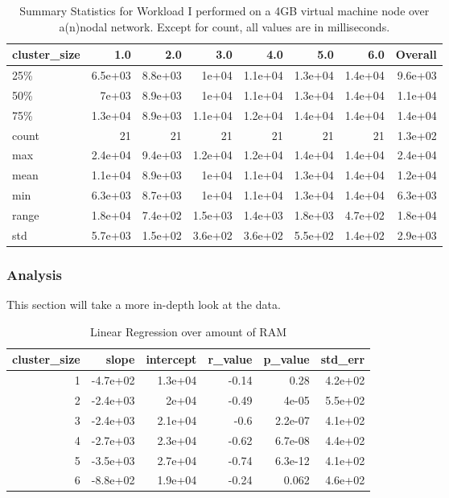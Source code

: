 \begin{table}
\begin{tabular}{lrrrrrrr}
\toprule
cluster\_size &     1.0 &     2.0 &     3.0 &     4.0 &     5.0 &     6.0 &  Overall \\
\midrule
25\%   & 6.5e+03 & 8.8e+03 &   1e+04 & 1.1e+04 & 1.3e+04 & 1.4e+04 &  9.6e+03 \\
50\%   &   7e+03 & 8.9e+03 &   1e+04 & 1.1e+04 & 1.3e+04 & 1.4e+04 &  1.1e+04 \\
75\%   & 1.3e+04 & 8.9e+03 & 1.1e+04 & 1.2e+04 & 1.4e+04 & 1.4e+04 &  1.4e+04 \\
count &      21 &      21 &      21 &      21 &      21 &      21 &  1.3e+02 \\
max   & 2.4e+04 & 9.4e+03 & 1.2e+04 & 1.2e+04 & 1.4e+04 & 1.4e+04 &  2.4e+04 \\
mean  & 1.1e+04 & 8.9e+03 &   1e+04 & 1.1e+04 & 1.3e+04 & 1.4e+04 &  1.2e+04 \\
min   & 6.3e+03 & 8.7e+03 &   1e+04 & 1.1e+04 & 1.3e+04 & 1.4e+04 &  6.3e+03 \\
range & 1.8e+04 & 7.4e+02 & 1.5e+03 & 1.4e+03 & 1.8e+03 & 4.7e+02 &  1.8e+04 \\
std   & 5.7e+03 & 1.5e+02 & 3.6e+02 & 3.6e+02 & 5.5e+02 & 1.4e+02 &  2.9e+03 \\
\bottomrule
\end{tabular}
\caption{Summary Statistics for Workload I performed on a 4GB virtual machine node over a(n)nodal network.  Except for count, all values are in milliseconds.}
\label{table:summary_table_i_4GB_vm_nodal}
\end{table}




\subsubsection{Analysis}
This section will take a more in-depth look at the data.


\begin{table}[H]
\centering
\begin{tabular}{rrrrrr}
\toprule
 cluster\_size &    slope &  intercept &  r\_value &  p\_value &  std\_err \\
\midrule
            1 & -4.7e+02 &    1.3e+04 &    -0.14 &     0.28 &  4.2e+02 \\
            2 & -2.4e+03 &      2e+04 &    -0.49 &    4e-05 &  5.5e+02 \\
            3 & -2.4e+03 &    2.1e+04 &     -0.6 &  2.2e-07 &  4.1e+02 \\
            4 & -2.7e+03 &    2.3e+04 &    -0.62 &  6.7e-08 &  4.4e+02 \\
            5 & -3.5e+03 &    2.7e+04 &    -0.74 &  6.3e-12 &  4.1e+02 \\
            6 & -8.8e+02 &    1.9e+04 &    -0.24 &    0.062 &  4.6e+02 \\
\bottomrule
\end{tabular}
\caption{Linear Regression over amount of RAM}
\label{table:ram_v_ram_i}
\end{table}



